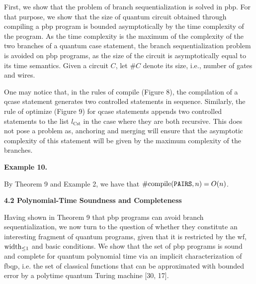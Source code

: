 \documentclass[10pt,a4paper]{amsart}
\begin{document}
 
First, we show that the problem of branch sequentialization is solved in pbp. For that purpose, we show that the size of quantum circuit obtained through compiling a pbp program is bounded asymptotically by the time complexity of the program. As the time complexity is the maximum of the complexity of the two branches of a quantum case statement, the branch sequentialization problem is avoided on pbp programs, as the size of the circuit is asymptotically equal to its time semantics. Given a circuit $C$, let $\#C$ denote its size, i.e., number of gates and wires.\par
 

 
One may notice that, in the rules of compile (Figure 8), the compilation of a qcase statement generates two controlled statements in sequence. Similarly, the rule of optimize (Figure 9) for qcase statements appends two controlled statements to the list $l_{\mathrm{Cst}}$ in the case where they are both recursive. This does not pose a problem as, anchoring and merging will ensure that the asymptotic complexity of this statement will be given by the maximum complexity of the branches.\par
 
 
 
\par\medskip\noindent\textbf{Example 10.}\par
 
 
By Theorem 9 and Example 2, we have that $\#\textnormal{{compile}}{}(\texttt{PAIRS},n)=O(n)$.\par
 
 
 
 
 
\par\medskip\noindent\textbf{4.2 Polynomial-Time Soundness and Completeness}\par
 
 
Having shown in Theorem 9 that pbp programs can avoid branch sequentialization, we now turn to the question of whether they constitute an interesting fragment of quantum programs, given that it is restricted by the wf, $\textnormal{{width}}_{\leq 1}$ and basic conditions. We show that the set of pbp programs is sound and complete for quantum polynomial time via an implicit characterization of fbqp, i.e. the set of classical functions that can be approximated with bounded error by a polytime quantum Turing machine [30, 17].\par
 
\end{document}
